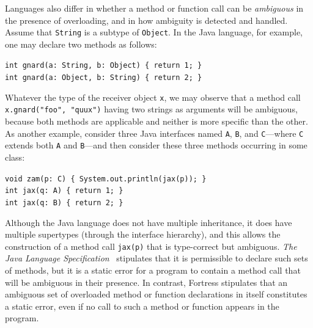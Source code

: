 Languages also differ in whether a method or function call can be \emph{ambiguous}
in the presence of overloading, and in how ambiguity is detected and handled.
Assume that {\tt String} is a subtype of {\tt Object}.
In the Java language, for example, one may declare two methods as follows:
\begin{tabbing}
{\tt int gnard(a:~String, b:~Object) \{ return 1; \}} \\
{\tt int gnard(a:~Object, b:~String) \{ return 2; \}}
\end{tabbing}
Whatever the type of the receiver object {\tt x},
we may observe that a method call {\tt x.gnard("foo", "quux")}
having two strings as arguments will be ambiguous, because both methods
are applicable and neither is more specific than the other.  As another example,
consider three Java interfaces named {\tt A}, {\tt B}, and {\tt C}---where
{\tt C} extends both {\tt A} and {\tt B}---and then consider these three methods
occurring in some class:
\begin{tabbing}
{\tt void zam(p: C) \{ System.out.println(jax(p)); \}} \\
{\tt int jax(q: A) \{ return 1; \}} \\
{\tt int jax(q: B) \{ return 2; \}}
\end{tabbing}
Although the Java language does not have multiple inheritance, it does have multiple
supertypes (through the interface hierarchy), and this allows the
construction of a method call {\tt jax(p)} that is type-correct but ambiguous.
{\it The Java Language Specification}~\cite[\S 15.11.2.2]{JLS1} stipulates that it is permissible
to declare such sets of methods, but it is a static error for a program
to contain a method call that will be ambiguous in their presence.
In contrast, Fortress stipulates that an ambiguous set of overloaded method or function
declarations in itself constitutes a static error, even if no call to such a method
or function appears in the program.

